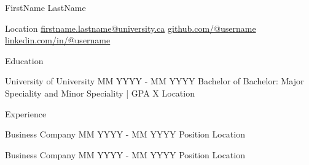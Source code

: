 \documentclass{resume}
\begin{document}
\begin{namesection}
    {FirstName LastName}
\end{namesection}

\begin{contactsection}
    {Location}
    {\href{mailto:firstname.lastname@university.ca}{firstname.lastname@university.ca}}
    {\href{https://github.com/}{github.com/@username}}
    {\href{https://www.linkedin.com/in/}{linkedin.com/in/@username}}
\end{contactsection}

\begin{headersection}
    {Education}
\end{headersection}
\begin{generalsection}
    {University of University}
    {MM YYYY - MM YYYY}
    {Bachelor of Bachelor: Major Speciality and Minor Speciality | GPA X}
    {Location}
\end{generalsection}

\begin{headersection}
    {Experience}
    
    \begin{itemsection}
        {Business Company}
        {MM YYYY - MM YYYY}
        {Position}
        {Location}

        \item \lipsum[1][1]
        \item \lipsum[2][4-7]
    \end{itemsection}
    \itemsectionskip
    \begin{itemsection}
        {Business Company}
        {MM YYYY - MM YYYY}
        {Position}
        {Location}

        \item \lipsum[5][1-3]
        \item \lipsum[5][4-6]
        \item \lipsum[1][4-7]
    \end{itemsection}
\end{headersection}
\end{document}
